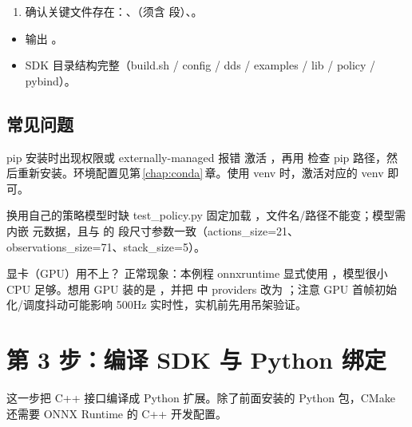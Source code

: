 \begin{enumerate}[resume]
\item 确认关键文件存在：、（须含  段）、。

\end{enumerate}
\begin{expected}
\begin{itemize}
\item {} 输出 。
\item SDK 目录结构完整（build.sh / config / dds / examples / lib / policy / pybind）。

\end{itemize}
\end{expected}
\subsection*{常见问题}
\begin{faq}{pip 安装时出现权限或 externally-managed 报错}
激活 ，再用  检查 pip 路径，然后重新安装。环境配置见第\,\ref{chap:conda}\,章。使用 venv 时，激活对应的 venv 即可。
\end{faq}
\begin{faq}{换用自己的策略模型时缺 }
test\_policy.py 固定加载 ，文件名/路径不能变；模型需内嵌  元数据，且与  的  段尺寸参数一致（actions\_size=21、observations\_size=71、stack\_size=5）。
\end{faq}
\begin{faq}{显卡（GPU）用不上？}
正常现象：本例程 onnxruntime 显式使用 ，模型很小 CPU 足够。想用 GPU 装的是 ，并把  中 providers 改为 ；注意 GPU 首帧初始化/调度抖动可能影响 500Hz 实时性，实机前先用吊架验证。
\end{faq}


\section{第 3 步：编译 SDK 与 Python 绑定}
\label{step:3}
这一步把 C++ 接口编译成 Python 扩展。除了前面安装的 Python 包，CMake 还需要 ONNX Runtime 的 C++ 开发配置。


